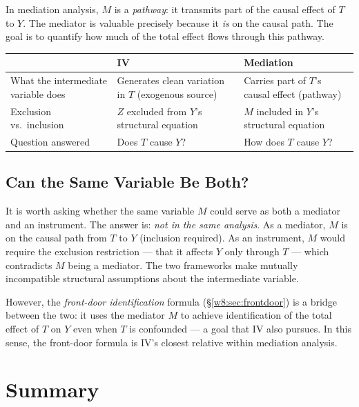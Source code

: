 \documentclass[master.tex]{subfiles}
\begin{document}
\medskip\noindent In mediation analysis, $M$ is a \emph{pathway}: it
transmits part of the causal effect of $T$ to $Y$.  The mediator is
valuable precisely because it \emph{is} on the causal path.  The goal
is to quantify how much of the total effect flows through this pathway.

\begin{tcolorbox}[defstyle, title={The Key Conceptual Distinction}]
\begin{center}
\renewcommand{\arraystretch}{1.4}
\begin{tabular}{p{3cm} p{5cm} p{4.5cm}}
\toprule
& \textbf{IV} & \textbf{Mediation} \\
\midrule
What the intermediate variable does
  & Generates clean variation in $T$ (exogenous source)
  & Carries part of $T$'s causal effect (pathway) \\
Exclusion vs.\ inclusion
  & $Z$ excluded from $Y$'s structural equation
  & $M$ included in $Y$'s structural equation \\
Question answered
  & Does $T$ cause $Y$?
  & How does $T$ cause $Y$? \\
\bottomrule
\end{tabular}
\end{center}
\end{tcolorbox}

\subsection{Can the Same Variable Be Both?}

It is worth asking whether the same variable $M$ could serve as both a
mediator and an instrument.  The answer is: \emph{not in the same
analysis}.  As a mediator, $M$ is on the causal path from $T$ to $Y$
(inclusion required).  As an instrument, $M$ would require the
exclusion restriction --- that it affects $Y$ only through $T$ --- which
contradicts $M$ being a mediator.  The two frameworks make
mutually incompatible structural assumptions about the intermediate
variable.

However, the \emph{front-door identification} formula (§\ref{w8:sec:frontdoor})
is a bridge between the two: it uses the mediator $M$ to achieve
identification of the total effect of $T$ on $Y$ even when $T$ is
confounded --- a goal that IV also pursues.  In this sense, the
front-door formula is IV's closest relative within mediation analysis.

\section{Summary}
\label{w8:sec:summary}
\end{document}
